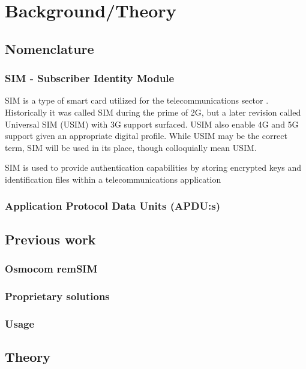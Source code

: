 \chapter{Background/Theory}

\section{Nomenclature}

\subsection{SIM - Subscriber Identity Module}

SIM is a type of smart card utilized for the telecommunications sector
\cite{sim}. Historically it was called SIM during the prime of 2G,
but a later revision called Universal SIM (USIM) with 3G \cite{usim}
support surfaced. USIM also enable 4G and 5G support given an
appropriate digital profile. While USIM may be the correct term, SIM
will be used in its place, though colloquially mean USIM.

SIM is used to provide authentication capabilities by storing
encrypted keys and identification files within a telecommunications
application \cite{sim-application}

\subsection{Application Protocol Data Units (APDU:s)}

\section{Previous work}

\subsection{Osmocom remSIM}

\subsection{Proprietary solutions}

\subsection{Usage}

\section{Theory}
